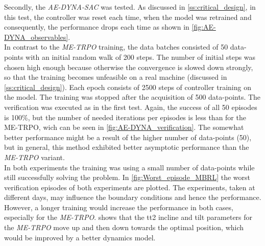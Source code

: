 \documentclass[
reprint,
amsmath,amssymb,amsfonts,clevref,
aps,
prstab,
]{revtex4-2}
\begin{document}
	Secondly, the \emph{AE-DYNA-SAC} was tested. As discussed in \cref{ss:critical_design}, in this test, the controller was reset each time, when the model was retrained and consequently, the performance drops each time as shown in \cref{fig:AE-DYNA_observables}.\\
	In contrast to the \emph{ME-TRPO} training, the data batches consisted of 50 data-points with an initial random walk of 200 steps. The number of initial steps was chosen high enough because otherwise the convergence is slowed down strongly, so that the training becomes unfeasible on a real machine (discussed in \cref{ss:critical_design}). Each epoch consists of 2500 steps of controller training on the model. The training was stopped after the acquisition of 500 data-points. The verification was executed as in the first test. Again, the success of all 50 episodes is 100\%, but the number of needed iterations per episodes is less than for the ME-TRPO, wich can be seen in \cref{fig:AE-DYNA_verification}. The somewhat better performance might be a result of the higher number of data-points (50), but in general, this method exhibited better asymptotic performance than the \emph{ME-TRPO} variant.\\
	In both experiments the training was using a small number of data-points while still successfully solving the problem. In \cref{fig:Worst_episode_MBRL} the worst verification episodes of both experiments are plotted. The experiments, taken at different days, may influence the boundary conditions and hence the performance. However, a longer training would increase the performance in both cases, especially for the \emph{ME-TRPO}.  shows that the tt2 incline and tilt parameters for the \emph{ME-TRPO} move up and then down towards the optimal position, which would be improved by a better dynamics model.
\end{document}
